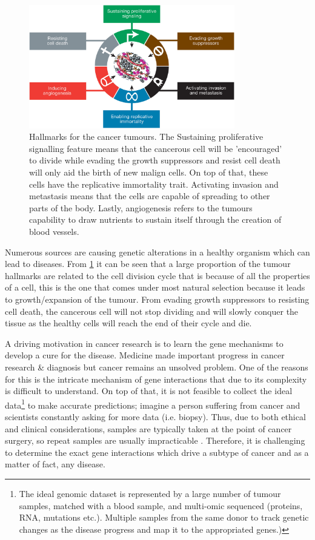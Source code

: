\begin{figure}[!ht]
  \centering\includegraphics[width=0.8\textwidth,height=0.8\textheight,keepaspectratio]{Images/TCGA/tumour_causes}
    \caption{Hallmarks for the cancer tumours\cite{Hanahan2011-px}. The Sustaining proliferative signalling feature means that the cancerous cell will be 'encouraged' to divide while evading the growth suppressors and resist cell death will only aid the birth of new malign cells. On top of that, these cells have the replicative immortality trait. Activating invasion and metastasis means that the cells are capable of spreading to other parts of the body. Lastly, angiogenesis refers to the tumours capability to draw nutrients to sustain itself through the creation of blood vessels. }
    \label{fig:hallmarks_cancer}
\end{figure}

Numerous sources are causing genetic alterations in a healthy organism which can lead to diseases. From \cref{fig:hallmarks_cancer} it can be seen that a large proportion of the tumour hallmarks are related to the cell division cycle that is because of all the properties of a cell, this is the one that comes under most natural selection because it leads to growth/expansion of the tumour. From evading growth suppressors to resisting cell death, the cancerous cell will not stop dividing and will slowly conquer the tissue as the healthy cells will reach the end of their cycle and die.

A driving motivation in cancer research is to learn the gene mechanisms to develop a cure for the disease. Medicine made important progress in cancer research \& diagnosis but cancer remains an unsolved problem. One of the reasons for this is the intricate mechanism of gene interactions that due to its complexity is difficult to understand. On top of that, it is not feasible to collect the ideal data\footnote{The ideal genomic dataset is represented by a large number of tumour samples, matched with a blood sample, and multi-omic sequenced (proteins, RNA, mutations etc.). Multiple samples from the same donor to track genetic changes as the disease progress and map it to the appropriated genes.)} to make accurate predictions; imagine a person suffering from cancer and scientists constantly asking for more data (i.e. biopsy). Thus, due to both ethical and clinical considerations, samples are typically taken at the point of cancer surgery, so repeat samples are usually impracticable . Therefore, it is challenging to determine the exact gene interactions which drive a subtype of cancer and as a matter of fact, any disease. 

